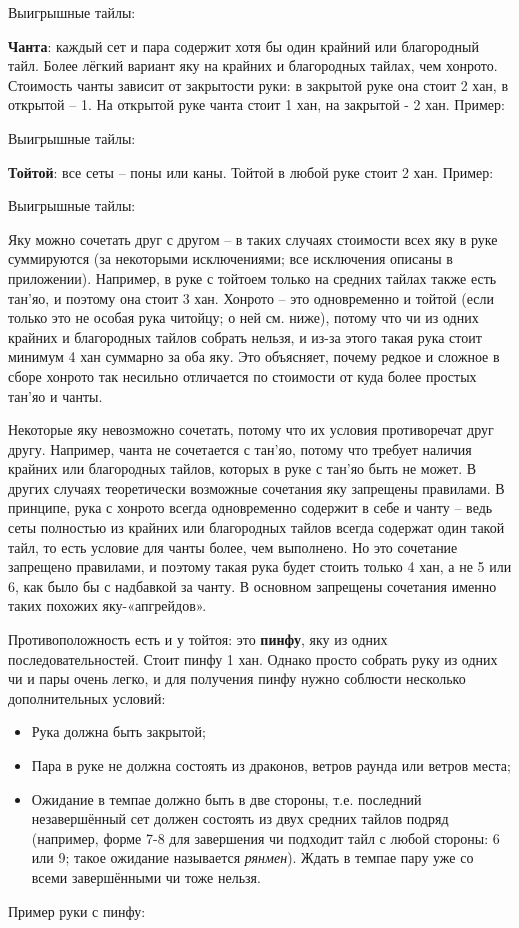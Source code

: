 
Выигрышные тайлы: 

\textbf{Чанта}: каждый сет и пара содержит хотя бы один крайний или благородный тайл. Более лёгкий вариант яку на крайних и благородных тайлах, чем хонрото. Стоимость чанты зависит от закрытости руки: в закрытой руке она стоит 2 хан, в открытой – 1. На открытой руке чанта стоит 1 хан, на закрытой - 2 хан. Пример:


Выигрышные тайлы: 

\textbf{Тойтой}: все сеты – поны или каны. Тойтой в любой руке стоит 2 хан. Пример:

\hfill {}

Выигрышные тайлы: 

Яку можно сочетать друг с другом – в таких случаях стоимости всех яку в руке суммируются (за некоторыми исключениями; все исключения описаны в приложении). Например, в руке с тойтоем только на средних тайлах также есть тан'яо, и поэтому она стоит 3 хан. Хонрото – это одновременно и тойтой (если только это не особая рука читойцу; о ней см. ниже), потому что чи из одних крайних и благородных тайлов собрать нельзя, и из-за этого такая рука стоит минимум 4 хан суммарно за оба яку. Это объясняет, почему редкое и сложное в сборе хонрото так несильно отличается по стоимости от куда более простых тан'яо и чанты.

Некоторые яку невозможно сочетать, потому что их условия противоречат друг другу. Например, чанта не сочетается с тан'яо, потому что требует наличия крайних или благородных тайлов, которых в руке с тан'яо быть не может. В других случаях теоретически возможные сочетания яку запрещены правилами. В принципе, рука с хонрото всегда одновременно содержит в себе и чанту – ведь сеты полностью из крайних или благородных тайлов всегда содержат один такой тайл, то есть условие для чанты более, чем выполнено. Но это сочетание запрещено правилами, и поэтому такая рука будет стоить только 4 хан, а не 5 или 6, как было бы с надбавкой за чанту. В основном запрещены сочетания именно таких похожих яку-«апгрейдов».

Противоположность есть и у тойтоя: это \textbf{пинфу}, яку из одних последовательностей. Стоит пинфу 1 хан. Однако просто собрать руку из одних чи и пары очень легко, и для получения пинфу нужно соблюсти несколько дополнительных условий:
\begin{itemize}
	\item Рука должна быть закрытой;
	\item Пара в руке не должна состоять из драконов, ветров раунда или ветров места;
	\item Ожидание в темпае должно быть в две стороны, т.е. последний незавершённый сет должен состоять из двух средних тайлов подряд (например, форме 7-8 для завершения чи подходит тайл с любой стороны: 6 или 9; такое ожидание называется \textit{рянмен}). Ждать в темпае пару уже со всеми завершёнными чи тоже нельзя.
\end{itemize}
Пример руки с пинфу:

